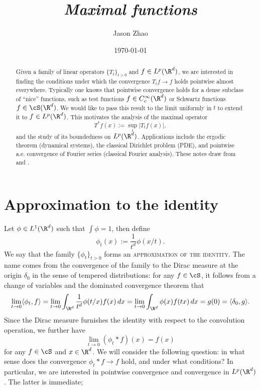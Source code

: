 \documentclass[reqno]{amsart}
\title
{
	\emph{Maximal functions}
}
\author{Jason Zhao}
\date{\today}
\theoremstyle{definition}
\theoremstyle{remark}
\renewcommand{\emph}{\textsc}
\begin{document}
\maketitle

\begin{abstract}
	Given a family of linear operators $\{T_t\}_{t > 0}$ and $f \in L^p (\R^d)$, we are interested in finding the conditions under which the convergence $T_t f \to f$ holds pointwise almost everywhere. Typically one knows that pointwise convergence holds for a dense subclass of ``nice'' functions, such as test functions $f \in C^\infty_c (\R^d)$ or Schwartz functions $f \in \cS(\R^d)$. We would like to pass this result to the limit uniformly in $t$ to extend it to $f \in L^p (\R^d)$. This motivates the analysis of the maximal operator 
		\[ T^* f(x) := \sup_t |T_t f(x)|, \]
	and the study of its boundedness on $L^p (\R^d)$. Applications include the ergodic theorem (dynamical systems), the classical Dirichlet problem (PDE), and pointwise a.e. convergence of Fourier series (classical Fourier analysis). These notes draw from \cite{Duoandikoetxea2001} and \cite{Stein1993}. 
\end{abstract}

\tableofcontents

\section{Approximation to the identity}

Let $\phi \in L^1 (\R^d)$ such that $\int \phi = 1$, then define
	\[ \phi_t (x) := \frac{1}{t^d} \phi(x/t). \]
We say that the family $\{ \phi_t  \}_{t > 0}$ forms an \emph{approximation of the identity}. The name comes from the convergence of the family to the Dirac measure at the origin $\delta_0$ in the sense of tempered distributions: for any $f\in \cS$, it follows from a change of variables and the dominated convergence theorem that
	\[ \lim_{t \to 0} \langle \phi_t, f \rangle = \lim_{t \to 0} \int_{\R^d} \frac{1}{t^d} \phi(t/x) f(x) \, dx =  \lim_{t \to 0}\int_{\R^d} \phi(x) f(tx) \, dx = g(0) = \langle \delta_0, g \rangle.  \]
Since the Dirac measure furnishes the identity with respect to the convolution operation, we further have
	\[ \lim_{t \to 0} (\phi_t * f)(x) = f(x) \]	
for any $f \in \cS$ and $x \in \R^d$. We will consider the following question: in what sense does the convergence $\phi_t * f \to f$ hold, and under what conditions? In particular, we are interested in pointwise convergence and convergence in $L^p (\R^d)$. The latter is immediate;
\end{document}
